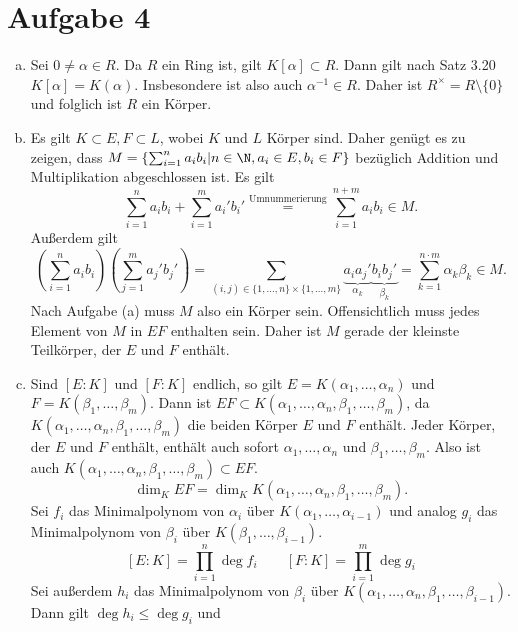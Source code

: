 \documentclass{article}
\begin{document}
    \section*{Aufgabe 4}
    \begin{enumerate}[(a)]
        \item Sei $0 \neq \alpha \in R$. Da $R$ ein Ring ist, gilt $K[\alpha] \subset R$. Dann gilt nach Satz 3.20 $K[\alpha] = K(\alpha)$. Insbesondere ist also auch $\alpha^{-1} \in R$. Daher ist $R^\times = R\setminus\{0\}$ und folglich ist $R$ ein Körper.
        \item Es gilt $K \subset E, F \subset L$, wobei $K$ und $L$ Körper sind. Daher genügt es zu zeigen, dass $M = \left\{\sum_{i = 1}^{n} a_ib_i | n \in \N, a_i \in E, b_i \in F\right\}$ bezüglich Addition und Multiplikation abgeschlossen ist.
        Es gilt
        \[
            \sum_{i = 1}^{n} a_ib_i + \sum_{i = 1}^{m} a_i'b_i' \overset{\text{Umnummerierung}}{=} \sum_{i = 1}^{n+m} a_ib_i \in M.
        \]
        Außerdem gilt
        \[
            \left(\sum_{i = 1}^{n} a_ib_i\right)\left(\sum_{j = 1}^{m} a_j'b_j'\right) = \sum_{(i,j)\in \{1,\dots,n\} \times \{1,\dots,m\}} \underbrace{a_ia_j'}_{\alpha_k}\underbrace{b_ib_j'}_{\beta_k} = \sum_{k = 1}^{n\cdot m} \alpha_k\beta_k \in M.
        \]
        Nach Aufgabe (a) muss $M$ also ein Körper sein. Offensichtlich muss jedes Element von $M$ in $EF$ enthalten sein. Daher ist $M$ gerade der kleinste Teilkörper, der $E$ und $F$ enthält.
        \item Sind $[E:K]$ und $[F:K]$ endlich, so gilt $E = K(\alpha_1,\dots, \alpha_n)$ und $F = K(\beta_1, \dots, \beta_m)$. Dann ist $EF \subset K(\alpha_1,\dots, \alpha_n, \beta_1, \dots, \beta_m)$, da $K(\alpha_1,\dots, \alpha_n, \beta_1, \dots, \beta_m)$ die beiden Körper $E$ und $F$ enthält. Jeder Körper, der $E$ und $F$ enthält, enthält auch sofort $\alpha_1, \dots, \alpha_n$ und $\beta_1, \dots, \beta_m$. Also ist auch $K(\alpha_1,\dots, \alpha_n, \beta_1, \dots, \beta_m)\subset EF$.
        \[
            \dim_K EF = \dim_K K(\alpha_1,\dots, \alpha_n, \beta_1, \dots, \beta_m).
        \]
        Sei $f_i$ das Minimalpolynom von $\alpha_i$ über $K(\alpha_1,\dots, \alpha_{i-1})$ und analog $g_i$ das Minimalpolynom von $\beta_i$ über $K(\beta_1, \dots, \beta_{i-1})$. 
        \[
            [E:K] = \prod_{i=1}^n \deg f_i \qquad [F:K] = \prod_{i=1}^m \deg g_i
        \]
        Sei außerdem $h_i$ das Minimalpolynom von $\beta_i$ über $K(\alpha_1, \dots, \alpha_n, \beta_1,\dots, \beta_{i-1})$. Dann gilt $\deg h_i \leq \deg g_i$ und
        \[
\]
\end{enumerate}
\end{document}

